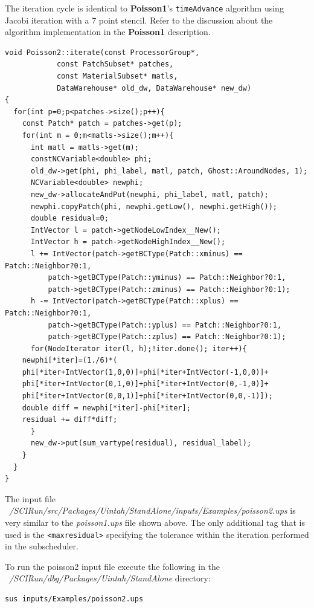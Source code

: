 \documentclass[12pt]{report}
\begin{document}
The iteration cycle is identical to \textbf{Poisson1}'s
\texttt{timeAdvance} algorithm using Jacobi iteration with a 7 point
stencil.  Refer to the discussion about the algorithm implementation
in the \textbf{Poisson1} description.

\begin{Verbatim}[fontsize=\footnotesize]
void Poisson2::iterate(const ProcessorGroup*,
		    const PatchSubset* patches,
		    const MaterialSubset* matls,
		    DataWarehouse* old_dw, DataWarehouse* new_dw)
{
  for(int p=0;p<patches->size();p++){
    const Patch* patch = patches->get(p);
    for(int m = 0;m<matls->size();m++){
      int matl = matls->get(m);
      constNCVariable<double> phi;
      old_dw->get(phi, phi_label, matl, patch, Ghost::AroundNodes, 1);
      NCVariable<double> newphi;
      new_dw->allocateAndPut(newphi, phi_label, matl, patch);
      newphi.copyPatch(phi, newphi.getLow(), newphi.getHigh());
      double residual=0;
      IntVector l = patch->getNodeLowIndex__New();
      IntVector h = patch->getNodeHighIndex__New(); 
      l += IntVector(patch->getBCType(Patch::xminus) == Patch::Neighbor?0:1,
		  patch->getBCType(Patch::yminus) == Patch::Neighbor?0:1,
		  patch->getBCType(Patch::zminus) == Patch::Neighbor?0:1);
      h -= IntVector(patch->getBCType(Patch::xplus) == Patch::Neighbor?0:1,
		  patch->getBCType(Patch::yplus) == Patch::Neighbor?0:1,
		  patch->getBCType(Patch::zplus) == Patch::Neighbor?0:1);
      for(NodeIterator iter(l, h);!iter.done(); iter++){
	newphi[*iter]=(1./6)*(
	phi[*iter+IntVector(1,0,0)]+phi[*iter+IntVector(-1,0,0)]+
	phi[*iter+IntVector(0,1,0)]+phi[*iter+IntVector(0,-1,0)]+
	phi[*iter+IntVector(0,0,1)]+phi[*iter+IntVector(0,0,-1)]);
	double diff = newphi[*iter]-phi[*iter];
	residual += diff*diff;
      }
      new_dw->put(sum_vartype(residual), residual_label);
    }
  }
}

\end{Verbatim}

The input file
\emph{~/SCIRun/src/Packages/Uintah/StandAlone/inputs/Examples/poisson2.ups}
is very similar to the \emph{poisson1.ups} file shown above.  The only
additional tag that is used is the \texttt{<maxresidual>} specifying
the tolerance within the iteration performed in the subscheduler.

To run the poisson2 input file execute the following in the
\emph{~/SCIRun/dbg/Packages/Uintah/StandAlone} directory:

\begin{Verbatim}[fontsize=\footnotesize]
	sus inputs/Examples/poisson2.ups

\end{Verbatim}
\end{document}
